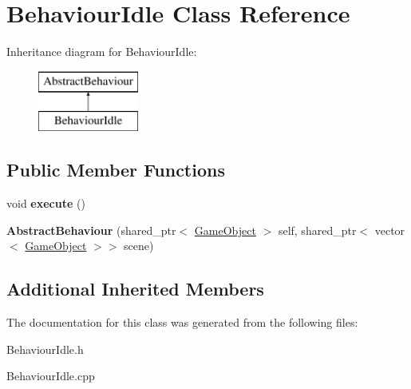 \hypertarget{class_behaviour_idle}{}\section{Behaviour\+Idle Class Reference}
\label{class_behaviour_idle}
Inheritance diagram for Behaviour\+Idle\+:\begin{figure}[H]
\begin{center}
\leavevmode
\includegraphics[height=2.000000cm]{class_behaviour_idle}
\end{center}
\end{figure}
\subsection*{Public Member Functions}
\begin{DoxyCompactItemize}
\item 
\mbox{\label{class_behaviour_idle_ac810c315b1ea41772060b216ecdc2e11}} 
void {\bfseries execute} ()
\item 
\mbox{\label{class_behaviour_idle_a8a3a9217b3179f949a1d6a32f340c00c}} 
{\bfseries Abstract\+Behaviour} (shared\+\_\+ptr$<$ \mbox{\hyperlink{class_game_object}{Game\+Object}} $>$ self, shared\+\_\+ptr$<$ vector$<$ \mbox{\hyperlink{class_game_object}{Game\+Object}} $>$$>$ scene)
\end{DoxyCompactItemize}
\subsection*{Additional Inherited Members}


The documentation for this class was generated from the following files\+:\begin{DoxyCompactItemize}
\item 
Behaviour\+Idle.\+h\item 
Behaviour\+Idle.\+cpp\end{DoxyCompactItemize}
